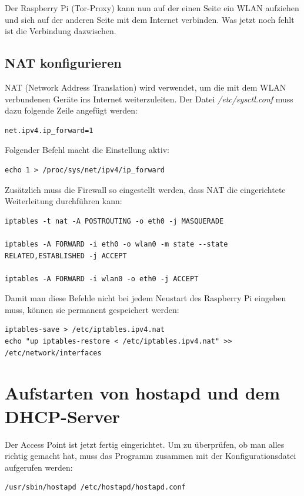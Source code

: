 Der Raspberry Pi (Tor-Proxy) kann nun auf der einen Seite ein WLAN aufziehen und sich auf der anderen Seite mit dem Internet verbinden. Was jetzt noch fehlt ist die Verbindung dazwischen.

\subsection{NAT konfigurieren}
NAT (Network Address Translation) wird verwendet, um die mit dem WLAN verbundenen Geräte ins Internet weiterzuleiten. Der Datei \textit{/etc/sysctl.conf} muss dazu folgende Zeile angefügt werden:

\begin{lstlisting}
net.ipv4.ip_forward=1
\end{lstlisting}

Folgender Befehl macht die Einstellung aktiv:

\begin{lstlisting}
echo 1 > /proc/sys/net/ipv4/ip_forward
\end{lstlisting}

Zusätzlich muss die Firewall so eingestellt werden, dass NAT die eingerichtete Weiterleitung durchführen kann:

\begin{lstlisting}
iptables -t nat -A POSTROUTING -o eth0 -j MASQUERADE

iptables -A FORWARD -i eth0 -o wlan0 -m state --state RELATED,ESTABLISHED -j ACCEPT

iptables -A FORWARD -i wlan0 -o eth0 -j ACCEPT
\end{lstlisting}

Damit man diese Befehle nicht bei jedem Neustart des Raspberry Pi eingeben muss, können sie permanent gespeichert werden:

\begin{lstlisting}
iptables-save > /etc/iptables.ipv4.nat
echo "up iptables-restore < /etc/iptables.ipv4.nat" >> /etc/network/interfaces
\end{lstlisting}

\section{Aufstarten von hostapd und dem DHCP-Server}
Der Access Point ist jetzt fertig eingerichtet. Um zu überprüfen, ob man alles richtig gemacht hat, muss das Programm zusammen mit der Konfigurationsdatei aufgerufen werden:
\begin{lstlisting}
/usr/sbin/hostapd /etc/hostapd/hostapd.conf
\end{lstlisting}

